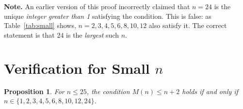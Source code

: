 \documentclass[12pt]{article}
\theoremstyle{plain}
\newtheorem{proposition}[theorem]{Proposition}
\theoremstyle{definition}
\begin{document}
\medskip
\noindent\textbf{Note.}
An earlier version of this proof incorrectly claimed that $n = 24$ is the unique
\emph{integer greater than 1} satisfying the condition.  This is false: as
Table~\ref{tab:small} shows, $n = 2, 3, 4, 5, 6, 8, 10, 12$ also satisfy it.
The correct statement is that 24 is the \emph{largest} such $n$.

\bigskip

\section{Verification for Small \texorpdfstring{$n$}{n}}

\begin{proposition}\label{prop:small}
  For $n \leq 25$, the condition $M(n) \leq n+2$ holds if and only if
  $n \in \{1, 2, 3, 4, 5, 6, 8, 10, 12, 24\}$.
\end{proposition}
\end{document}

